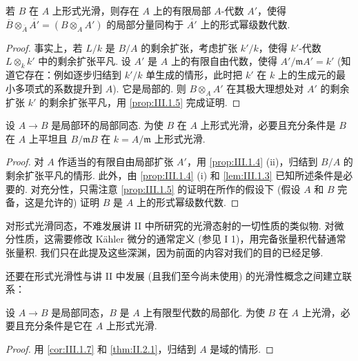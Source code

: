 \begin{corollary}\label{cor:III.1.6}
若 $B$ 在 $A$ 上形式光滑，则存在 $A$ 上的有限局部 $A$-代数 $A'$，使得 $\overline{B} \otimes_{\overline{A}} \overline{A'} = \overline{(B \otimes_A A')}$ 的局部分量同构于 $\overline{A'}$ 上的形式幂级数代数.
\end{corollary}

\begin{proof}
事实上，若 $L/k$ 是 $B/A$ 的剩余扩张，考虑扩张 $k'/k$，使得 $k'$-代数 $L \otimes_k k'$ 中的剩余扩张平凡. 设 $A'$ 是 $A$ 上的有限自由代数，使得 $A'/\mathfrak{m}A' = k'$ (知道它存在：例如逐步归结到 $k'/k$ 单生成的情形，此时把 $k'$ 在 $k$ 上的生成元的最小多项式的系数提升到 $A$). 它是局部的. 则 $B \otimes_A A'$ 在其极大理想处对 $A'$ 的剩余扩张 $k'$ 的剩余扩张平凡，用 \ref{prop:III.1.5} 完成证明.
\end{proof}

\begin{corollary}\label{cor:III.1.7}
设 $A \to B$ 是局部环的局部同态. 为使 $B$ 在 $A$ 上形式光滑，必要且充分条件是 $B$ 在 $A$ 上平坦且 $B/\mathfrak{m}B$ 在 $k = A/\mathfrak{m}$ 上形式光滑.
\end{corollary}

\begin{proof}
对 $A$ 作适当的有限自由局部扩张 $A'$，用 \ref{prop:III.1.4} (ii)，归结到 $B/A$ 的剩余扩张平凡的情形. 此外，由 \ref{prop:III.1.4} (i) 和 \ref{lem:III.1.3} 已知所述条件是必要的. 对充分性，只需注意 \ref{prop:III.1.5} 的证明在所作的假设下 (假设 $A$ 和 $B$ 完备，这是允许的) 证明 $B$ 是 $A$ 上的形式幂级数代数.
\end{proof}

\begin{remark}\label{rem:III.1.8}
对形式光滑同态，不难发展讲 II 中所研究的光滑态射的一切性质的类似物. 对微分性质，这需要修改 Kähler 微分的通常定义 (参见 I 1)，用完备张量积代替通常张量积. 我们只在此提及这些深渊，因为前面的内容对我们的目的已经足够.
\end{remark}

还要在形式光滑性与讲 II 中发展 (且我们至今尚未使用) 的光滑性概念之间建立联系：

\begin{proposition}\label{prop:III.1.9}
设 $A \to B$ 是局部同态，$B$ 是 $A$ 上有限型代数的局部化. 为使 $B$ 在 $A$ 上光滑，必要且充分条件是它在 $A$ 上形式光滑.
\end{proposition}

\begin{proof}
用 \ref{cor:III.1.7} 和 \ref{thm:II.2.1}，归结到 $A$ 是域的情形.
\end{proof}

